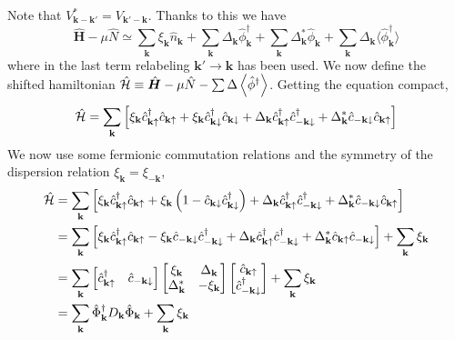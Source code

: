 Note that $V_{\mathbf{k}-\mathbf{k}'}^* = V_{\mathbf{k}'-\mathbf{k}}$. Thanks to this we have
\[
	\hat{\bm H} - \mu\hat{N} \simeq \sum_{\mathbf{k}} \xi_{\mathbf{k}} \hat n_\mathbf{k} + 
	\sum_\mathbf{k} \Delta_\mathbf{k} \hat{\phi}_\mathbf{k}^\dagger + \sum_\mathbf{k} \Delta_\mathbf{k}^* \hat{\phi}_\mathbf{k} + \sum_\mathbf{k} \Delta_\mathbf{k} \big\langle \hat{\phi}_\mathbf{k}^\dagger \big\rangle
\]
where in the last term relabeling $\mathbf{k}' \to \mathbf{k}$ has been used. We now define the shifted hamiltonian $\hat{\mathcal{H}} \equiv \hat{\bm H} - \mu\hat{N} - \sum \Delta \ev{\hat{\phi}^\dagger}$. Getting the equation compact,
\[
	\hat{\mathcal{H}} = \sum_\mathbf{k} \left[{\xi_\mathbf{k} \hat{c}_{\mathbf{k}\uparrow}^\dagger \hat{c}_{\mathbf{k}\uparrow} + \xi_\mathbf{k} \hat{c}_{\mathbf{k}\downarrow}^\dagger \hat{c}_{\mathbf{k}\downarrow} + \Delta_\mathbf{k} \hat{c}_{\mathbf{k}\uparrow}^\dagger \hat{c}_{-\mathbf{k}\downarrow}^\dagger + \Delta_\mathbf{k}^*	 \hat{c}_{-\mathbf{k}\downarrow} \hat{c}_{\mathbf{k}\uparrow} }\right]
\]
We now use some fermionic commutation relations and the symmetry of the dispersion relation $\xi_\mathbf{k} = \xi_{-\mathbf{k}}$,
\[
\begin{aligned}
	\hat{\mathcal{H}} &= \sum_\mathbf{k} \left[{\xi_\mathbf{k} \hat{c}_{\mathbf{k}\uparrow}^\dagger \hat{c}_{\mathbf{k}\uparrow} + \xi_\mathbf{k} \left({1-\hat{c}_{\mathbf{k}\downarrow} \hat{c}_{\mathbf{k}\downarrow}^\dagger}\right) + \Delta_\mathbf{k} \hat{c}_{\mathbf{k}\uparrow}^\dagger \hat{c}_{-\mathbf{k}\downarrow}^\dagger + \Delta_\mathbf{k}^*	 \hat{c}_{-\mathbf{k}\downarrow} \hat{c}_{\mathbf{k}\uparrow} }\right] \\
	&= \sum_\mathbf{k} \left[{\xi_\mathbf{k} \hat{c}_{\mathbf{k}\uparrow}^\dagger \hat{c}_{\mathbf{k}\uparrow} - \xi_\mathbf{k}
	\hat{c}_{-\mathbf{k}\downarrow} \hat{c}_{-\mathbf{k}\downarrow}^\dagger + \Delta_\mathbf{k} \hat{c}_{\mathbf{k}\uparrow}^\dagger \hat{c}_{-\mathbf{k}\downarrow}^\dagger + \Delta_\mathbf{k}^* \hat{c}_{\mathbf{k}\uparrow} \hat{c}_{-\mathbf{k}\downarrow} }\right] + \sum_\mathbf{k} \xi_\mathbf{k} \\
	&= \sum_\mathbf{k} \begin{bmatrix}
		\hat{c}_{\mathbf{k}\uparrow}^\dagger & \hat{c}_{-\mathbf{k}\downarrow}
	\end{bmatrix} \begin{bmatrix}
		\xi_\mathbf{k} & \Delta_\mathbf{k} \\
		\Delta_\mathbf{k}^* & - \xi_\mathbf{k}
	\end{bmatrix} \begin{bmatrix}
		\hat{c}_{\mathbf{k}\uparrow} \\
		\hat{c}_{-\mathbf{k}\downarrow}^\dagger
	\end{bmatrix} + \sum_\mathbf{k} \xi_\mathbf{k} \\
	&= \sum_\mathbf{k} \hat{\Phi}_\mathbf{k}^\dagger D_\mathbf{k} \hat{\Phi}_\mathbf{k} + \sum_\mathbf{k} \xi_\mathbf{k}
\end{aligned}
\]
